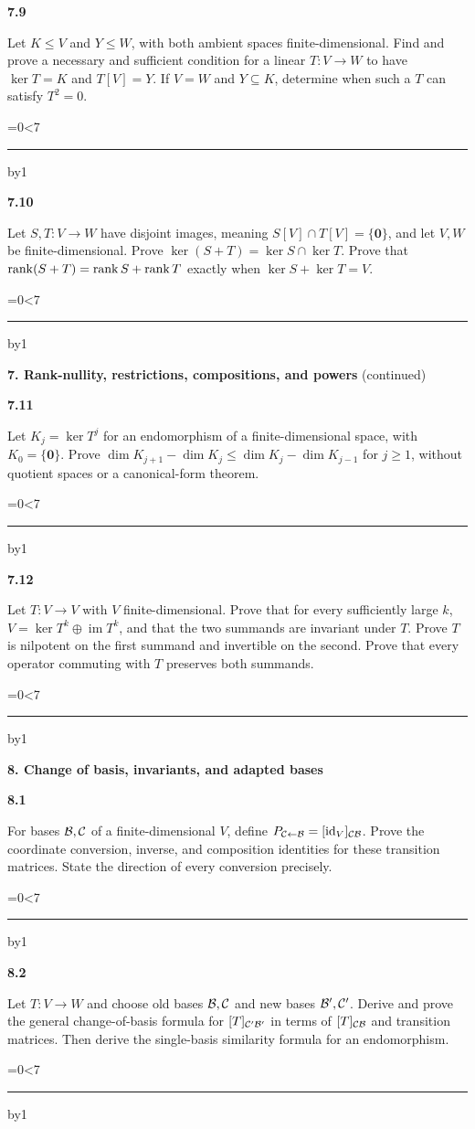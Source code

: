 \documentclass[11pt,letterpaper]{article}
\newcommand{\topicshort}{Problem collection}
\newcommand{\ruled}[1]{\par\begingroup\parskip=0pt\baselineskip=17pt\count255=0\loop\ifnum\count255<#1\noindent\textcolor{black!17}{\rule{\linewidth}{.25pt}}\par\advance\count255 by1\repeat\endgroup}
\newcommand{\problem}[4]{\noindent\begin{minipage}[t][3.48in][t]{\linewidth}\textbf{\color{navy}#1}\quad{\small\sffamily\color{teal}#2#3}\par #4\par\vfill\ruled{7}\end{minipage}}
\begin{document}
\problem{7.9}{M}{}{Let $K\le V$ and $Y\le W$, with both ambient spaces finite-dimensional. Find and prove a necessary and sufficient condition for a linear $T:V\to W$ to have $\ker T=K$ and $T[V]=Y$. If $V=W$ and $Y\subseteq K$, determine when such a $T$ can satisfy $T^2=0$.}
\par\vspace{14pt}
\problem{7.10}{M}{}{Let $S,T:V\to W$ have disjoint images, meaning $S[V]\cap T[V]=\{\mathbf0\}$, and let $V,W$ be finite-dimensional. Prove $\ker(S+T)=\ker S\cap\ker T$. Prove that $\operatorname{rank}(S+T)=\operatorname{rank} S+\operatorname{rank} T$ exactly when $\ker S+\ker T=V$.}
\newpage
\renewcommand{\topicshort}{Rank and powers}
{\large\bfseries\color{navy}7. Rank-nullity, restrictions, compositions, and powers} {\small(continued)}\par\vspace{9pt}
\problem{7.11}{C}{}{Let $K_j=\ker T^j$ for an endomorphism of a finite-dimensional space, with $K_0=\{\mathbf0\}$. Prove $\dim K_{j+1}-\dim K_j\le\dim K_j-\dim K_{j-1}$ for $j\ge1$, without quotient spaces or a canonical-form theorem.}
\par\vspace{14pt}
\problem{7.12}{C}{}{Let $T:V\to V$ with $V$ finite-dimensional. Prove that for every sufficiently large $k$, $V=\ker T^k\oplus\operatorname{im}T^k$, and that the two summands are invariant under $T$. Prove $T$ is nilpotent on the first summand and invertible on the second. Prove that every operator commuting with $T$ preserves both summands.}
\newpage
\renewcommand{\topicshort}{Change of basis}
{\large\bfseries\color{navy}8. Change of basis, invariants, and adapted bases}\par\vspace{9pt}
\problem{8.1}{W}{ / $\star$}{For bases $\mathcal B,\mathcal C$ of a finite-dimensional $V$, define $P_{\mathcal C\leftarrow\mathcal B}=[\operatorname{id}_V]_{\mathcal C\mathcal B}$. Prove the coordinate conversion, inverse, and composition identities for these transition matrices. State the direction of every conversion precisely.}
\par\vspace{14pt}
\problem{8.2}{W}{ / $\star$}{Let $T:V\to W$ and choose old bases $\mathcal B,\mathcal C$ and new bases $\mathcal B',\mathcal C'$. Derive and prove the general change-of-basis formula for $[T]_{\mathcal C'\mathcal B'}$ in terms of $[T]_{\mathcal C\mathcal B}$ and transition matrices. Then derive the single-basis similarity formula for an endomorphism.}
\newpage
\renewcommand{\topicshort}{Change of basis}
\end{document}
